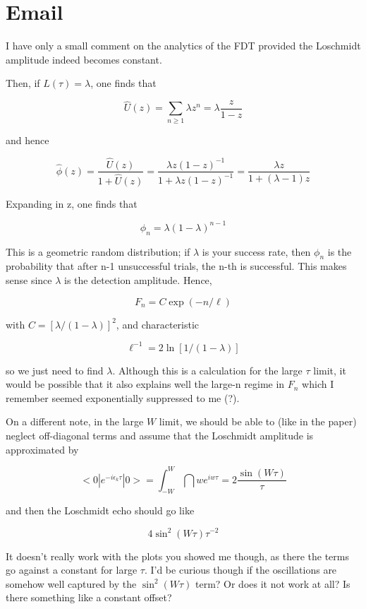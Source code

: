 \documentclass{article}
\numberwithin{equation}{section}
\newcommand{\1}{\mathbb{1}}
\begin{document}
\section{Email}
I have only a small comment on the analytics of the FDT provided the Loschmidt amplitude indeed becomes constant.

Then, if $L(\tau) = \lambda$, one finds that

$$\hat{U}(z) = \sum_{n \geq 1} \lambda z^n = \lambda \frac{z}{1-z}$$

and hence

$$\hat{\phi}(z) = \frac{\hat{U}(z)}{1 + \hat{U}(z)} = \frac{\lambda z (1-z)^{-1}}{ 1 + \lambda z (1-z)^{-1} } = \frac{\lambda z }{1 + (\lambda - 1) z}$$

Expanding in z, one finds that

$$\phi_n = \lambda(1-\lambda)^{n-1}$$

This is a geometric random distribution; if $\lambda$ is your success rate, then $\phi_n$ is the probability that after n-1 unsuccessful trials, the n-th is successful. This makes sense since $\lambda$ is the detection amplitude. Hence,

$$F_n = C \exp( - n / \ell )$$

with $C = [\lambda/(1-\lambda)]^2$, and characteristic

$$\ell^{-1} = 2 \ln [1 / (1 - \lambda)]$$

so we just need to find $\lambda$. Although this is a calculation for the large $\tau$ limit, it would be possible that it also explains well the large-n regime in $F_n$ which I remember seemed exponentially suppressed to me (?).

On a different note, in the large $W$ limit, we should be able to (like in the paper) neglect off-diagonal terms and assume that the Loschmidt amplitude is approximated by

$$<0| e^{-i \epsilon_k \tau} | 0> = \int_{-W}^W \dint{w} e^{i w \tau} = 2 \frac{\sin(W \tau)}{\tau}$$

and then the Loschmidt echo should go like

$$4 \sin^2(W \tau) \tau^{-2}$$

It doesn’t really work with the plots you showed me though, as there the terms go against a constant for large $\tau.$ I’d be curious though if the oscillations are somehow well captured by the $\sin^2(W \tau)$ term? Or does it not work at all? Is there something like a constant offset?
\end{document}
